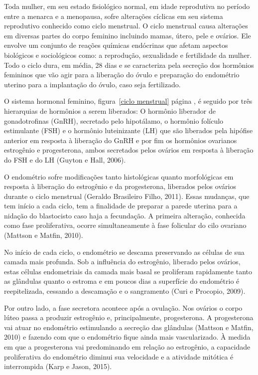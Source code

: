 \documentclass[12pt]{article} %
\begin{document}
Toda mulher, em seu estado fisiológico normal, em idade reprodutiva no
período entre a menarca e a menopausa, sofre alterações cíclicas em
seu sistema reprodutivo conhecido como ciclo menstrual. O ciclo
menstrual causa alterações em diversas partes do corpo feminino
incluindo mamas, útero, pele e ovários. Ele envolve um conjunto de
reações químicas endócrinas que afetam aspectos biológicos e
sociológicos como: a reprodução, sexualidade e fertilidade da
mulher. Todo o ciclo dura, em média, 28 dias e se caracteriza pela
secreção dos hormônios femininos que vão agir para a liberação do
óvulo e preparação do endométrio uterino para a implantação do óvulo,
caso seja fertilizado.

O sistema hormonal feminino, figura~\ref{ciclo menstrual} página
\pageref{ciclo menstrual}, é seguido por três hierarquias de hormônios
a serem liberados: O hormônio liberador de gonadotrofinas (GnRH),
secretado pelo hipotálamo, o hormônio folículo estimulante (FSH) e o
hormônio luteinizante (LH) que são liberados pela hipófise anterior
em resposta à liberação do GnRH e por fim os hormônios ovarianos
estrogênio e progesterona, ambos secretados pelos ovários em resposta
à liberação do FSH e do LH (Guyton e Hall, 2006).


O endométrio sofre modificações tanto histológicas quanto morfológicas
em resposta à liberação do estrogênio e da progesterona, liberados
pelos ovários durante o ciclo menstrual (Geraldo Brasileiro Filho,
2011). Essas mudanças, que tem início a cada ciclo, tem a finalidade
de preparar a parede uterina para a nidação do blastocisto caso haja a
fecundação. A primeira alteração, conhecida como fase proliferativa,
ocorre simultaneamente à fase folicular do cilo ovariano (Mattson e
Matfin, 2010).

No início de cada ciclo, o endométrio se descama preservando as
células de sua camada mais profunda. Sob a influência do estrogênio,
liberado pelos ovários, estas células endometriais da camada mais
basal se proliferam rapidamente tanto as glândulas quanto o estroma e
em poucos dias a superfície do endométrio é reepitelizada, cessando a
descamação e o sangramento (Curi e Procopio, 2009).

Por outro lado, a fase secretora acontece após a ovulação. Nos ovários
o corpo lúteo passa a produzir estrogênio e, principalmente,
progesterona. A progesterona vai atuar no endométrio estimulando a
secreção das glândulas (Mattson e Matfin, 2010) e fazendo com que o
endométrio fique ainda mais vascularizado. À medida em que a
progesterona vai predominando em relação ao estrogênio, a capacidade
proliferativa do endométrio diminui sua velocidade e a atividade
mitótica é interrompida (Karp e Jason, 2015).
\end{document}
